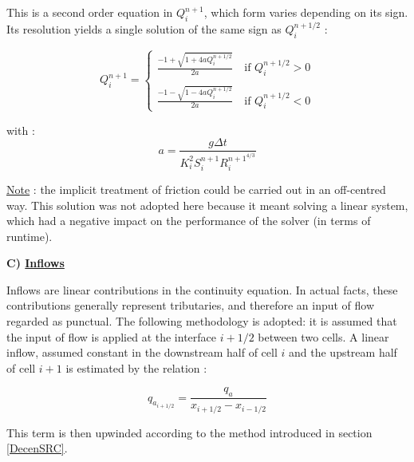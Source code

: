 \vspace{0.5cm}

This is a second order equation in $Q_{i}^{n+1}$, which form varies depending on its sign. Its resolution yields a single solution of the same sign as $Q_i^{n+1/2}$ :

\begin{equation}
Q_{i}^{n+1} = \left \lbrace
  \begin{array}{l}
    \frac{-1+\sqrt{1+4aQ_{i}^{n+1/2}}}{2a} \quad \mbox{if } Q_{i}^{n+1/2} > 0\\
    \\
    \frac{-1-\sqrt{1-4aQ_{i}^{n+1/2}}}{2a} \quad \mbox{if } Q_{i}^{n+1/2} < 0
  \end{array}
 \right.
\end{equation}

with :
\begin{equation}
 a = \frac{g \Delta t}{K_{i}^2 S_{i}^{n+1} R_{i}^{n+1^{4/3}}}
\end{equation}

\vspace{0.5cm}

\underline{Note} : the implicit treatment of friction could be carried out in an off-centred way. This solution was not adopted here because it meant solving a linear system, which had a negative impact on the performance of the solver (in terms of runtime).

\vspace{0.5cm}

\textbf{C) \underline{Inflows}}

\vspace{0.5cm}

Inflows are linear contributions in the continuity equation. In actual facts, these contributions generally represent tributaries, and therefore an input of flow regarded as punctual. The following methodology is adopted: it is assumed that the input of flow is applied at the interface $i+1/2$ between two cells. A linear inflow, assumed constant in the downstream half of cell $i$ and the upstream half of cell $i+1$ is estimated by the relation :

\begin{equation}
 q_{a_{i+1/2}} = \frac{q_a}{x_{i+1/2}-x_{i-1/2}}
\end{equation}

\vspace{0.5cm}

This term is then upwinded according to the method introduced in section \ref{DecenSRC}.

